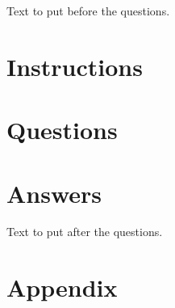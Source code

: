 \documentclass[11pt]{article}
\begin{document}
Text to put before the questions.


\section{Instructions}

\section{Questions}

\section{Answers}


Text to put after the questions.


\section{Appendix}

\end{document}
